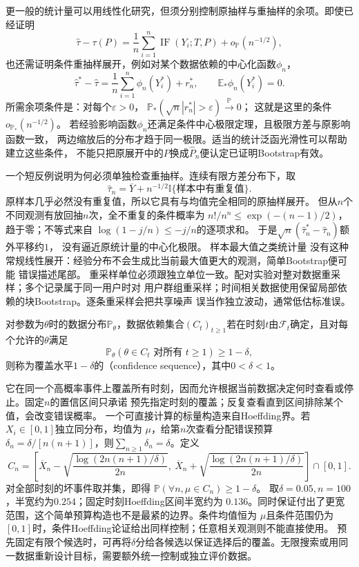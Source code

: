 更一般的统计量可以用线性化研究，但须分别控制原抽样与重抽样的余项。即使已经证明
\[
  \widehat\tau-\tau(P)
  =
  \frac1n\sum_{i=1}^n\operatorname{IF}(Y_i;T,P)
  +o_{\mathbb{P}}(n^{-1/2}),
\]
也还需证明条件重抽样展开，例如对某个数据依赖的中心化函数\(\phi_n\)，
\[
 \widehat\tau^\ast-\widehat\tau
 =\frac1n\sum_{i=1}^n\phi_n(Y_i^\ast)+r_n^\ast,\qquad
 \mathbb E_\ast\phi_n(Y_i^\ast)=0.
\]
所需余项条件是：对每个\(\varepsilon>0\)，
\(\mathbb P_\ast(\sqrt n|r_n^\ast|>\varepsilon)\xrightarrow{\mathbb P}0\)；
这就是这里的条件\(o_{\mathbb P_\ast}(n^{-1/2})\)。
若经验影响函数\(\phi_n\)还满足条件中心极限定理，且极限方差与原影响函数一致，
两边缩放后的分布才趋于同一极限。适当的统计泛函光滑性可以帮助建立这些条件，
不能只把原展开中的\(P\)换成\(\widehat P_n\)便认定已证明Bootstrap有效。

一个短反例说明为何必须单独检查重抽样。连续有限方差分布下，取
\[
 \widehat\tau_n=\overline Y+n^{-1/2}
 \mathbb I\{\text{样本中有重复值}\}.
\]
原样本几乎必然没有重复值，所以它具有与均值完全相同的原抽样展开。
但从\(n\)个不同观测有放回抽\(n\)次，全不重复的条件概率为
\(n!/n^n\leq\exp(-(n-1)/2)\)，趋于零；不等式来自
\(\log(1-j/n)\leq-j/n\)的逐项求和。
于是\(\sqrt n(\widehat\tau_n^\ast-\widehat\tau_n)\)额外平移约\(1\)，
没有逼近原统计量的中心化极限。
样本最大值之类统计量
没有这种常规线性展开：经验分布不会生成比当前最大值更大的观测，简单Bootstrap便可能
错误描述尾部。
重采样单位必须跟独立单位一致。配对实验对整对数据重采样；多个记录属于同一用户时对
用户群组重采样；时间相关数据使用保留局部依赖的块Bootstrap。逐条重采样会把共享噪声
误当作独立波动，通常低估标准误。
\begin{definition}[置信序列]
  \label{def:stoch-confidence-sequence}
  对参数为\(\theta\)时的数据分布\(\mathbb P_\theta\)，数据依赖集合\((C_t)_{t\geq1}\)若在时刻\(t\)由\(\mathcal F_t\)确定，且对每个允许的\(\theta\)满足
  \[ \mathbb P_\theta(\theta\in C_t\text{ 对所有 }t\geq1)\geq1-\delta, \]
  则称为覆盖水平\(1-\delta\)的（confidence sequence），其中\(0<\delta<1\)。
\end{definition}
它在同一个高概率事件上覆盖所有时刻，因而允许根据当前数据决定何时查看或停止。固定$n$的置信区间只承诺
预先指定时刻的覆盖；反复查看直到区间排除某个值，会改变错误概率。
一个可直接计算的标量构造来自Hoeffding界。若\(X_i\in[0,1]\)独立同分布，均值为
\(\mu\)，给第\(n\)次查看分配错误预算
\(\delta_n=\delta/[n(n+1)]\)，则\(\sum_{n\geq1}\delta_n=\delta\)。定义
\[
C_n=\left[\overline X_n-
\sqrt{\frac{\log(2n(n+1)/\delta)}{2n}},
\ \overline X_n+
\sqrt{\frac{\log(2n(n+1)/\delta)}{2n}}\right]\cap[0,1].
\]
对全部时刻的坏事件取并集，即得
\(\mathbb P(\forall n,\mu\in C_n)\geq1-\delta\)。
取\(\delta=0.05,n=100\)，半宽约为\(0.254\)；固定时刻Hoeffding区间半宽约为
\(0.136\)。同时保证付出了更宽范围，这个简单预算构造也不是最紧的边界。条件均值恒为
\(\mu\)且条件范围仍为\([0,1]\)时，条件Hoeffding论证给出同样控制；任意相关观测则不能直接使用。
预先固定有限个候选时，可再将\(\delta\)分给各候选以保证选择后的覆盖。无限搜索或用同一数据重新设计目标，需要额外统一控制或独立评价数据。

